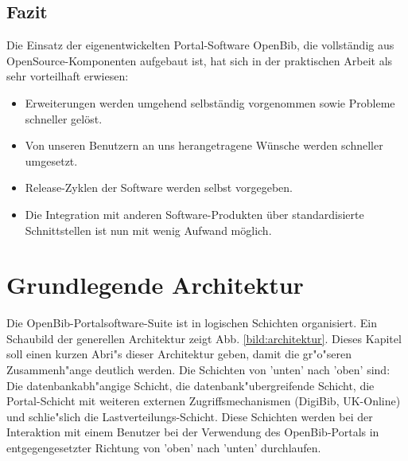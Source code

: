 \documentclass[11pt, twoside, a4paper, BCOR8mm, DIV12, bibtotoc,idxtotoc]{scrbook}
\begin{document}
\section{Fazit}

Die Einsatz der eigenentwickelten Portal-Software OpenBib, die
vollständig aus OpenSource-Komponenten aufgebaut ist, hat sich in der
praktischen Arbeit als sehr vorteilhaft erwiesen:

\begin{itemize}
\item Erweiterungen werden umgehend selbständig vorgenommen sowie
  Probleme schneller gelöst.
\item Von unseren Benutzern an uns herangetragene Wünsche werden
  schneller umgesetzt.
\item Release-Zyklen der Software werden selbst vorgegeben.
\item Die Integration mit anderen Software-Produkten über
  standardisierte Schnittstellen ist nun mit wenig Aufwand möglich.
\end{itemize}
    
\chapter{Grundlegende Architektur}

Die OpenBib-Portalsoftware-Suite ist in logischen Schichten
organisiert. Ein Schaubild der ge\-ne\-rellen Architektur zeigt Abb.
\ref{bild:architektur}. Dieses Kapitel soll einen kurzen Abri"s dieser
Architektur geben, damit die gr"o"seren Zusammenh"ange deutlich
werden. Die Schichten von 'unten' nach 'oben' sind: Die
datenbankabh"angige Schicht, die datenbank"ubergreifende Schicht, die
Portal-Schicht mit weiteren externen Zugriffsmechanismen (DigiBib,
UK-Online) und schlie"slich die Lastverteilungs-Schicht. Diese
Schichten werden bei der Interaktion mit einem Benutzer bei der
Verwendung des OpenBib-Portals in entgegengesetzter Richtung von
'oben' nach 'unten' durchlaufen.
\end{document}
